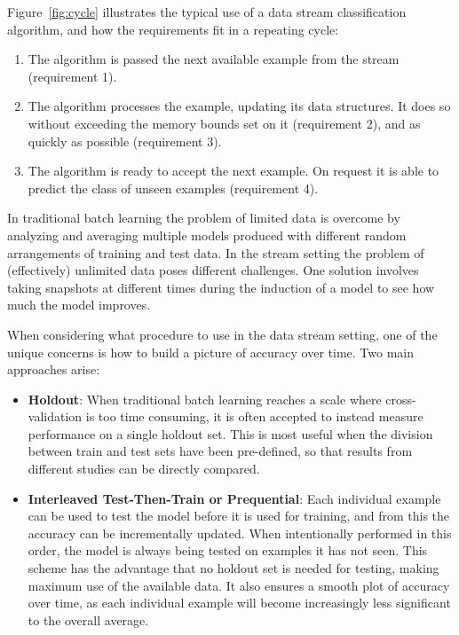 \documentclass[a4paper,12pt]{article}
\begin{document}
Figure~\ref{fig:cycle} illustrates the typical use of a data stream 
classification algorithm, and how the requirements fit 
in a repeating cycle:
\begin{enumerate}
\item  The algorithm is passed the next available example from the stream
   (requirement 1).
\item  The algorithm processes the example, updating its data structures. It
   does so without exceeding the memory bounds set on it (requirement 2),
   and as quickly as possible (requirement 3).
\item  The algorithm is ready to accept the next example. On request it is
   able to predict the class of unseen examples
   (requirement 4).
\end{enumerate}

In traditional batch learning the problem of limited data is overcome
by analyzing and averaging multiple models produced with different random
arrangements of training and test data. In the stream setting the problem of
(effectively) unlimited data poses different challenges. One solution involves
taking snapshots at different times during the induction of a model to see how
much the model improves.

    When considering what procedure to use in the data stream setting, one of
the unique concerns is how to build a picture of accuracy over time. Two main
approaches arise:
\begin{itemize}
 \item {\bf Holdout}:
When traditional batch learning reaches a scale where cross-validation is too time 
consuming, it is often accepted to instead measure performance on a single holdout
set. This is most useful when the division between train and test sets have
been pre-defined, so that results from different studies can be directly compared. 
\item {\bf Interleaved Test-Then-Train or Prequential}:
 Each individual example can be used to test the model
before it is used for training, and from this the accuracy can be incrementally
updated. When intentionally performed in this order, the model is always
being tested on examples it has not seen. This scheme has the advantage that
no holdout set is needed for testing, making maximum use of the available
data. It also ensures a smooth plot of accuracy over time, as each individual
example will become increasingly less significant to the overall average.
\end{itemize}
   
\end{document}
